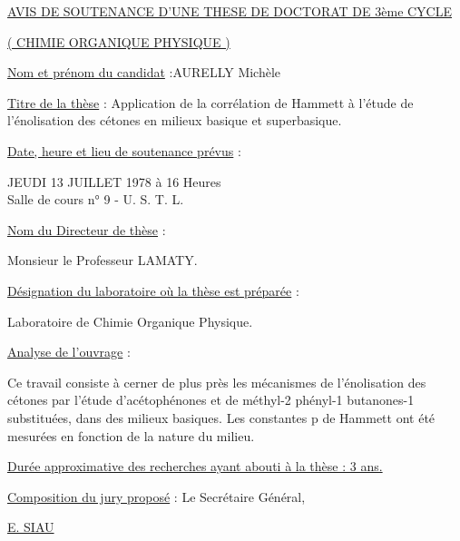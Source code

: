 \uline{AVIS DE SOUTENANCE D'UNE THESE DE DOCTORAT DE 3ème CYCLE}

\uline{( CHIMIE ORGANIQUE PHYSIQUE )}

\uline{Nom et prénom du candidat} :\qquad AURELLY Michèle

\uline{Titre de la thèse} : Application de la corrélation de Hammett à l'étude de l'énolisation des cétones en milieux basique et superbasique.

\uline{Date, heure et lieu de soutenance prévus} :

JEUDI 13 JUILLET 1978 à 16 Heures\\
Salle de cours n° 9 - U. S. T. L.

\uline{Nom du Directeur de thèse} :

Monsieur le Professeur LAMATY.

\uline{Désignation du laboratoire où la thèse est préparée} :

Laboratoire de Chimie Organique Physique.

\uline{Analyse de l'ouvrage} :

Ce travail consiste à cerner de plus près les mécanismes de l'énolisation des cétones par l'étude d'acétophénones et de méthyl-2 phényl-1 butanones-1 substituées, dans des milieux basiques. Les constantes p de Hammett ont été mesurées en fonction de la nature du milieu.

\uline{Durée approximative des recherches ayant abouti à la thèse : 3 ans.}

\uline{Composition du jury proposé} :
Le Secrétaire Général,


\uline{E. SIAU}
